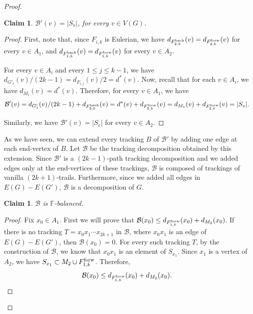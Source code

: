 \documentclass[12pt,reqno,a4paper]{amsart}
\newtheorem{claim}[theorem]{Claim}
\def\back{\mathop{\text{\rm back}}\nolimits}
\def\forw{\mathop{\text{\rm forw}}\nolimits}
\newcommand{\B}{\mathcal{B}}
\begin{document}
\begin{proof}
\begin{claim}
	\(\B'(v) = |S_v|\), for every $v\in V(G)$.
\end{claim}

\begin{proof}
First, note that, since \(F_{i,k}\) is Eulerian, we have 
\(d_{F_{2,k}^{\back}}(v) = 
d_{F_{2,k}^{\forw}}(v)\)
for every \(v\in A_1\), and \(d_{F_{1,k}^{\back}}(v) = 
d_{F_{1,k}^{\forw}}(v)\)
for every \(v\in A_2\).

For every \(v\in A_i\) and every \(1\leq j\leq k-1\), 
we have \(d_{G'_i}(v)/(2k-1) = d_{F_{i,j}}(v)/2 = d^*(v)\).
Now, recall that for each \(v\in A_i\), we have \(d_{M_i}(v) = 
d^*(v)\). Therefore, for every \(v\in A_1\), we have 
%
$$\B'(v) = d_{G'_1}(v)/(2k-1) + d_{F_{2,k}^{\back}}(v) 
			 = d^*(v) + d_{F_{2,k}^{\forw}}(v) 
			 = d_{M_1}(v)+ d_{F_{2,k}^{\forw}}(v) 
			 = |S_v|.$$


Similarly, we have $\B'(v)=|S_v|$ for every $v\in A_2$.
\end{proof}

As we have seen, we can extend every tracking \(B\) of 
\(\B'\) by adding one edge at
each end-vertex of \(B\). Let $\B$ be the tracking decomposition obtained by this 
extension. Since $\B'$ is a $(2k-1)$-path tracking decomposition and we added edges 
only at the end-vertices of these trackings, 
$\B$ is composed of trackings of vanilla \((2k+1)\)-trails. Furthermore, since we added all edges in 
\(E(G)-E(G')\), $\B$ is a decomposition of $G$.


\begin{claim}
\(\B\) is \(\mathbb{F}\)-balanced.
\end{claim}

\begin{proof}
Fix \(x_0\in A_1\). First we will prove that  \(\B(x_0) \leq 
d_{F_{1,k}^{\forw}}(x_0) + d_{M_2}(x_0)\). If there is no tracking \(T = 
x_0x_1\cdots x_{2k+1}\) in \(\B\),
where \(x_0x_1\) is an edge of \(E(G) - E(G')\), then $\B(x_0)=0$. 
For every such tracking $T$, by the construction of $\B$, we know that \(x_0x_1\) is an 
element of \(S_{x_1}\).
Since \(x_1\) is a vertex of \(A_2\), we have \(S_{x_1} \subset M_2\cup 
F_{1,k}^{\forw}\).
Therefore,
\begin{equation*}
\B(x_0) \leq d_{F_{1,k}^{\forw}}(x_0) + d_{M_2}(x_0).
\end{equation*}


\end{proof}
\end{proof}
\end{document}
